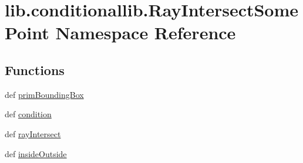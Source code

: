 \hypertarget{namespacelib_1_1conditionallib_1_1_ray_intersect_some_point}{\section{lib.\-conditionallib.\-Ray\-Intersect\-Some\-Point Namespace Reference}
\label{namespacelib_1_1conditionallib_1_1_ray_intersect_some_point}
}
\subsection*{Functions}
\begin{DoxyCompactItemize}
\item 
def \hyperlink{namespacelib_1_1conditionallib_1_1_ray_intersect_some_point_a5e27e315dc71a9f3d8f6bed7d5db9f98}{prim\-Bounding\-Box}
\item 
def \hyperlink{namespacelib_1_1conditionallib_1_1_ray_intersect_some_point_aea7472e6139983408ccd024187cb4962}{condition}
\item 
def \hyperlink{namespacelib_1_1conditionallib_1_1_ray_intersect_some_point_a51c51b9d99594e22857bc828634a3a56}{ray\-Intersect}
\item 
def \hyperlink{namespacelib_1_1conditionallib_1_1_ray_intersect_some_point_aa057fe6c84e7e48181bfdda6dfd00427}{inside\-Outside}
\end{DoxyCompactItemize}


